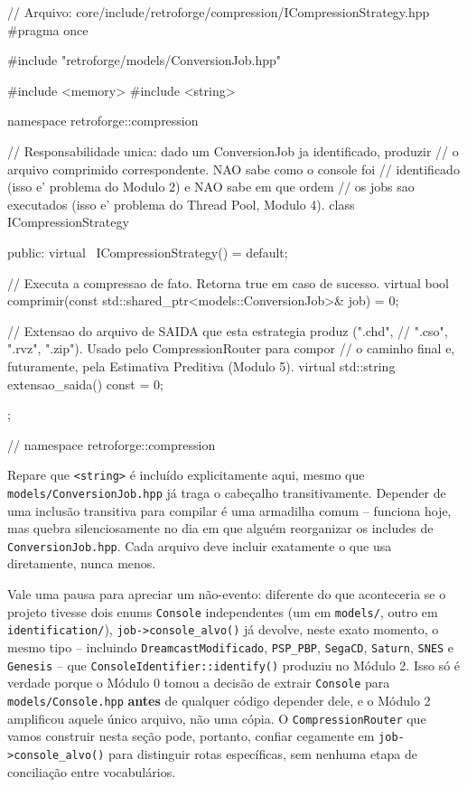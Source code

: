 \begin{CaixaCodigo}
// Arquivo: core/include/retroforge/compression/ICompressionStrategy.hpp
#pragma once

#include "retroforge/models/ConversionJob.hpp"

#include <memory>
#include <string>

namespace retroforge::compression {

// Responsabilidade unica: dado um ConversionJob ja identificado, produzir
// o arquivo comprimido correspondente. NAO sabe como o console foi
// identificado (isso e' problema do Modulo 2) e NAO sabe em que ordem
// os jobs sao executados (isso e' problema do Thread Pool, Modulo 4).
class ICompressionStrategy {
public:
    virtual ~ICompressionStrategy() = default;

    // Executa a compressao de fato. Retorna true em caso de sucesso.
    virtual bool comprimir(const std::shared_ptr<models::ConversionJob>& job) = 0;

    // Extensao do arquivo de SAIDA que esta estrategia produz (".chd",
    // ".cso", ".rvz", ".zip"). Usado pelo CompressionRouter para compor
    // o caminho final e, futuramente, pela Estimativa Preditiva (Modulo 5).
    virtual std::string extensao_saida() const = 0;
};

} // namespace retroforge::compression
\end{CaixaCodigo}

\begin{CaixaAlerta}
Repare que \texttt{<string>} é incluído explicitamente aqui, mesmo que \texttt{models/ConversionJob.hpp} já traga o cabeçalho transitivamente. Depender de uma inclusão transitiva para compilar é uma armadilha comum -- funciona hoje, mas quebra silenciosamente no dia em que alguém reorganizar os includes de \texttt{ConversionJob.hpp}. Cada arquivo deve incluir exatamente o que usa diretamente, nunca menos.
\end{CaixaAlerta}

\begin{CaixaInfo}
Vale uma pausa para apreciar um não-evento: diferente do que aconteceria se o projeto tivesse dois enums \texttt{Console} independentes (um em \texttt{models/}, outro em \texttt{identification/}), \texttt{job->console\_alvo()} já devolve, neste exato momento, o mesmo tipo -- incluindo \texttt{DreamcastModificado}, \texttt{PSP\_PBP}, \texttt{SegaCD}, \texttt{Saturn}, \texttt{SNES} e \texttt{Genesis} -- que \texttt{ConsoleIdentifier::identify()} produziu no Módulo 2. Isso só é verdade porque o Módulo 0 tomou a decisão de extrair \texttt{Console} para \texttt{models/Console.hpp} \textbf{antes} de qualquer código depender dele, e o Módulo 2 amplificou aquele único arquivo, não uma cópia.
O \texttt{CompressionRouter} que vamos construir nesta seção pode, portanto, confiar cegamente em \texttt{job->console\_alvo()} para distinguir rotas específicas, sem nenhuma etapa de conciliação entre vocabulários.
\end{CaixaInfo}

